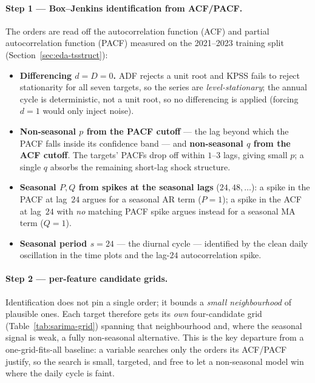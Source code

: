 \documentclass[12pt,a4paper,oneside]{report}
\begin{document}
\paragraph{Step 1 --- Box--Jenkins identification from ACF/PACF.}
The orders are read off the autocorrelation function (ACF) and partial
autocorrelation function (PACF) measured on the 2021--2023 training split
(Section~\ref{sec:eda-tsstruct}):
\begin{itemize}
  \item \textbf{Differencing $d=D=0$.} ADF rejects a unit root and KPSS fails to
        reject stationarity for all seven targets, so the series are
        \emph{level-stationary}; the annual cycle is deterministic, not a unit
        root, so no differencing is applied (forcing $d{=}1$ would only inject
        noise).
  \item \textbf{Non-seasonal $p$ from the PACF cutoff} --- the lag beyond which the
        PACF falls inside its confidence band --- and \textbf{non-seasonal $q$ from
        the ACF cutoff}. The targets' PACFs drop off within $1$--$3$ lags, giving
        small $p$; a single $q$ absorbs the remaining short-lag shock structure.
  \item \textbf{Seasonal $P,Q$ from spikes at the seasonal lags} ($24,48,\dots$):
        a spike in the PACF at lag~$24$ argues for a seasonal AR term ($P{=}1$); a
        spike in the ACF at lag~$24$ with \emph{no} matching PACF spike argues
        instead for a seasonal MA term ($Q{=}1$).
  \item \textbf{Seasonal period $s=24$} --- the diurnal cycle --- identified by the
        clean daily oscillation in the time plots and the lag-$24$ autocorrelation
        spike.
\end{itemize}

\paragraph{Step 2 --- per-feature candidate grids.}
Identification does not pin a single order; it bounds a \emph{small neighbourhood}
of plausible ones. Each target therefore gets its \emph{own} four-candidate grid
(Table~\ref{tab:sarima-grid}) spanning that neighbourhood and, where the seasonal
signal is weak, a fully non-seasonal alternative. This is the key departure from a
one-grid-fits-all baseline: a variable searches only the orders its ACF/PACF
justify, so the search is small, targeted, and free to let a non-seasonal model
win where the daily cycle is faint.
\end{document}
